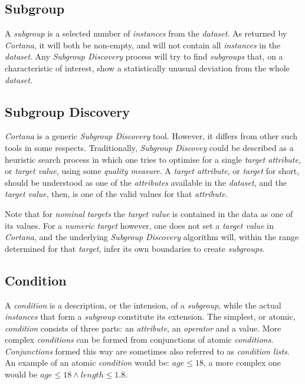 \documentclass{article}
\begin{document}
\subsection{Subgroup}
\label{preliminaries:subgroup}
A \emph{subgroup} is a selected number of \emph{instances} from the \emph{dataset}.
As returned by \emph{Cortana}, it will both be non-empty, and will not contain all \emph{instances} in the \emph{dataset}.
Any \emph{Subgroup Discovery} process will try to find \emph{subgroups} that, on a characteristic of interest, show a statistically unusual deviation from the whole \emph{dataset}.



\subsection{Subgroup Discovery}
\label{preliminaties:subgroup-discovery}
\emph{Cortana} is a generic \emph{Subgroup Discovery} tool.
However, it differs from other such tools in some respects.
Traditionally, \emph{Subgroup Discovey} could be described as a heuristic search process in which one tries to optimise for a single \emph{target attribute}, or \emph{target value}, using some \emph{quality measure}.
A \emph{target attribute}, or \emph{target} for short, should be understood as one of the \emph{attributes} available in the \emph{dataset}, and the \emph{target value}, then, is one of the valid values for that \emph{attribute}.

Note that for \emph{nominal} \emph{targets} the \emph{target value} is contained in the data as one of its values.
For a \emph{numeric} \emph{target} however, one does not set a \emph{target value} in \emph{Cortana}, and the underlying \emph{Subgroup Discovery} algorithm will, within the range determined for that \emph{target}, infer its own boundaries to create \emph{subgroups}.



\subsection{Condition}
\label{preliminaries:condition}
A \emph{condition} is a description, or the intension, of a \emph{subgroup}, while the actual \emph{instances} that form a \emph{subgroup} constitute its extension.
The simplest, or atomic, \emph{condition} consists of three parts: an \emph{attribute}, an \emph{operator} and a value.
More complex \emph{conditions} can be formed from conjunctions of atomic \emph{conditions}.
\emph{Conjunctions} formed this way are sometimes also referred to as \emph{condition lists}.
An example of an atomic \emph{condition} would be: $age \leq 18$, a more complex one would be $age \leq 18 \wedge length \leq 1.8$.
\end{document}
